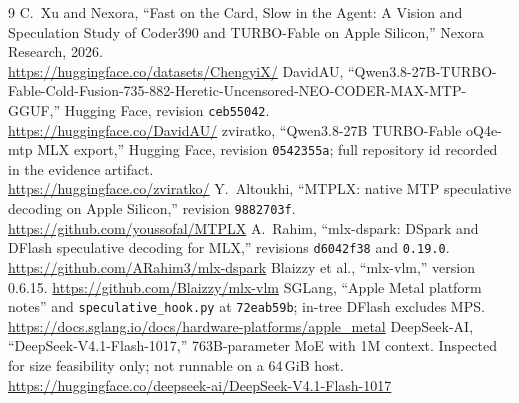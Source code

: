 \documentclass[11pt]{article}
\begin{document}
{\raggedright\sloppy
\begin{thebibliography}{9}
 C.~Xu and Nexora, ``Fast on the Card, Slow in the Agent: A Vision and Speculation Study of Coder390 and TURBO-Fable on Apple Silicon,'' Nexora Research, 2026.\\
\url{https://huggingface.co/datasets/ChengyiX/}
 DavidAU, ``Qwen3.8-27B-TURBO-Fable-Cold-Fusion-735-882-Heretic-Uncensored-NEO-CODER-MAX-MTP-GGUF,'' Hugging Face, revision \texttt{ceb55042}.\\
\url{https://huggingface.co/DavidAU/}
 zviratko, ``Qwen3.8-27B TURBO-Fable oQ4e-mtp MLX export,'' Hugging Face, revision \texttt{0542355a}; full repository id recorded in the evidence artifact.\\
\url{https://huggingface.co/zviratko/}
 Y.~Altoukhi, ``MTPLX: native MTP speculative decoding on Apple Silicon,'' revision \texttt{9882703f}. \url{https://github.com/youssofal/MTPLX}
 A.~Rahim, ``mlx-dspark: DSpark and DFlash speculative decoding for MLX,'' revisions \texttt{d6042f38} and \texttt{0.19.0}. \url{https://github.com/ARahim3/mlx-dspark}
 Blaizzy et al., ``mlx-vlm,'' version 0.6.15. \url{https://github.com/Blaizzy/mlx-vlm}
 SGLang, ``Apple Metal platform notes'' and \texttt{speculative\_hook.py} at \texttt{72eab59b}; in-tree DFlash excludes MPS. \url{https://docs.sglang.io/docs/hardware-platforms/apple_metal}
 DeepSeek-AI, ``DeepSeek-V4.1-Flash-1017,'' 763B-parameter MoE with 1M context. Inspected for size feasibility only; not runnable on a 64\,GiB host. \url{https://huggingface.co/deepseek-ai/DeepSeek-V4.1-Flash-1017}
\end{thebibliography}
}
\end{document}

